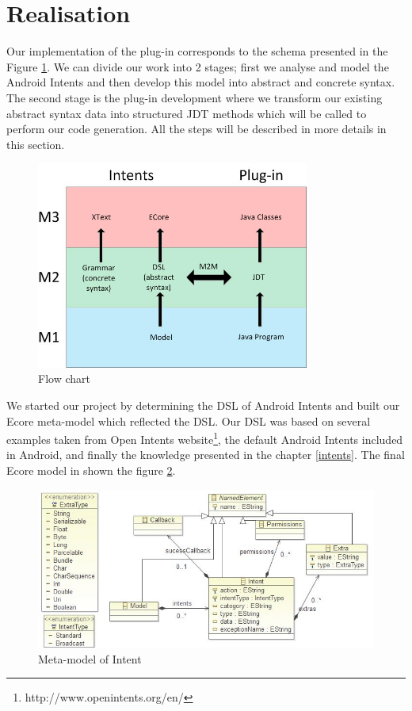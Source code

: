 \section{Realisation}
\label{realisation}

Our implementation of the plug-in corresponds to the schema presented in the Figure \ref{flowchart}. We can divide our work into 2 stages; first we analyse and model the Android Intents and then develop this model into abstract and concrete syntax. The second stage is the plug-in development where we transform our existing abstract syntax data into structured JDT methods which will be called to perform our code generation. All the steps will be described in more details in this section.  

\begin{figure}[H]
\label{flowchart}
  \centering
    \includegraphics[width=0.8\textwidth]{flowchart}
  \caption{Flow chart}
\end{figure}

We started our project by determining the DSL of Android Intents and built our Ecore meta-model which reflected the DSL. Our DSL was based on several examples taken from Open Intents website\footnote{http://www.openintents.org/en/}, the default Android Intents included in Android, and finally the knowledge presented in the chapter \ref{intents}. The final Ecore model in shown the figure \ref{meta-model}.

\begin{figure}[H]
\label{meta-model}
  \centering
    \includegraphics[width=\textwidth]{metamodel}
  \caption{Meta-model of Intent}
\end{figure}


